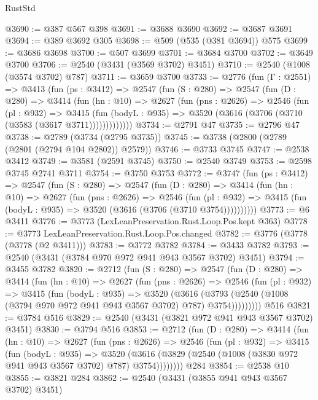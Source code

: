 \begin{lexlean}{RustStd}
\begin{coremodule}
@3690 := @387 @567 @398
@3691 := @3688 @3690
@3692 := @3687 @3691
@3694 := @389 @3692 @305
@3698 := @509 (@535 (@381 @3694)) @575
@3699 := @3686 @3698
@3700 := @507 @3699
@3701 := @3684 @3700
@3702 := @3649 @3700
@3706 := @2540 (@3431 (@3569 @3702) @3451)
@3710 := @2540 (@1008 (@3574 @3702) @787)
@3711 := @3659 @3700
@3733 := @2776
    (fun (Γ : @2551) =>
    @3413
      (fun (ps : @3412) =>
      @2547
        (fun (S : @280) =>
        @2547
          (fun (D : @280) =>
          @3414
            (fun (hn : @10) =>
            @2627
              (fun (pns : @2626) =>
              @2546
                (fun (pl : @932) =>
                @3415
                  (fun (bodyL : @935) => @3520 (@3616 (@3706 (@3710 (@3583 (@3617 @3711)))))))))))))
@3734 := @2791 @47
@3735 := @2796 @47
@3738 := @2789 (@3734 (@2795 @3735))
@3745 := @3738 (@2800 (@2789 (@2801 (@2794 @104 @2802)) @2579))
@3746 := @3733 @3745
@3747 := @2538 @3412
@3749 := @3581 (@2591 @3745)
@3750 := @2540 @3749
@3753 := @2598 @3745 @2741 @3711
@3754 := @3750 @3753
@3772 := @3747
    (fun (ps : @3412) =>
    @2547
      (fun (S : @280) =>
      @2547
        (fun (D : @280) =>
        @3414
          (fun (hn : @10) =>
          @2627
            (fun (pns : @2626) =>
            @2546
              (fun (pl : @932) =>
              @3415 (fun (bodyL : @935) => @3520 (@3616 (@3706 (@3710 @3754))))))))))
@3773 := @6 @3411
@3776 := @3773 (LexLeanPreservation.Rust.Loop.Pos.kept @363)
@3778 := @3773 LexLeanPreservation.Rust.Loop.Pos.changed
@3782 := @3776 (@3778 (@3778 (@2 @3411)))
@3783 := @3772 @3782
@3784 := @3433 @3782
@3793 := @2540 (@3431 (@3784 @970 @972 @941 @943 @3567 @3702) @3451)
@3794 := @3455 @3782
@3820 := @2712
    (fun (S : @280) =>
    @2547
      (fun (D : @280) =>
      @3414
        (fun (hn : @10) =>
        @2627
          (fun (pns : @2626) =>
          @2546
            (fun (pl : @932) =>
            @3415
              (fun (bodyL : @935) =>
              @3520
                (@3616
                  (@3793 (@2540 (@1008 (@3794 @970 @972 @941 @943 @3567 @3702) @787) @3754)))))))))
    @516
@3821 := @3784 @516
@3829 := @2540 (@3431 (@3821 @972 @941 @943 @3567 @3702) @3451)
@3830 := @3794 @516
@3853 := @2712
    (fun (D : @280) =>
    @3414
      (fun (hn : @10) =>
      @2627
        (fun (pns : @2626) =>
        @2546
          (fun (pl : @932) =>
          @3415
            (fun (bodyL : @935) =>
            @3520 (@3616 (@3829 (@2540 (@1008 (@3830 @972 @941 @943 @3567 @3702) @787) @3754))))))))
    @284
@3854 := @2538 @10
@3855 := @3821 @284
@3862 := @2540 (@3431 (@3855 @941 @943 @3567 @3702) @3451)

\end{coremodule}
\end{lexlean}
